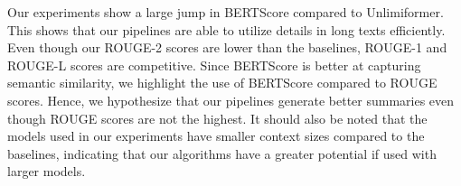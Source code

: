 \documentclass[letterpaper]{article} %
\begin{document}
	Our experiments show a large jump in BERTScore compared to Unlimiformer.
	This shows that our pipelines are able to utilize details in long texts efficiently.
	Even though our ROUGE-2 scores are lower than the baselines, ROUGE-1 and ROUGE-L scores are
	competitive.
	Since BERTScore is better at capturing semantic similarity, we highlight the use of BERTScore
	compared to ROUGE scores.
	Hence, we hypothesize that our pipelines generate better summaries even though ROUGE scores are
	not the highest.
	It should also be noted that the models used in our experiments have smaller context sizes
	compared to the baselines, indicating that our algorithms have a greater potential if
	used with larger models.



% 
\end{document}
